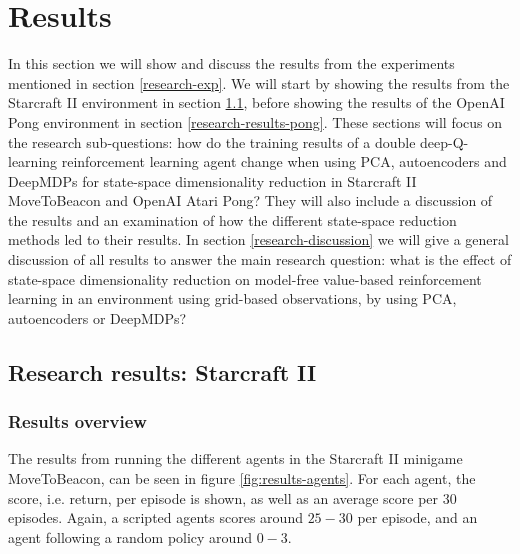 \section{Results}\label{research-results}
In this section we will show and discuss the results from the experiments mentioned in section \ref{research-exp}. We will start by showing the results from the Starcraft II environment in section \ref{research-results-pysc2}, before showing the results of the OpenAI Pong environment in section \ref{research-results-pong}. These sections will focus on the research sub-questions: how do the training results of a double deep-Q-learning reinforcement learning agent change when using PCA, autoencoders and DeepMDPs for state-space dimensionality reduction in Starcraft II MoveToBeacon and OpenAI Atari Pong? They will also include a discussion of the results and an examination of how the different state-space reduction methods led to their results. In section \ref{research-discussion} we will give a general discussion of all results to answer the main research question: what is the effect of state-space dimensionality reduction on model-free value-based reinforcement learning in an environment using grid-based observations, by using PCA, autoencoders or DeepMDPs?

\subsection{Research results: Starcraft II}\label{research-results-pysc2}
\subsubsection{Results overview}
The results from running the different agents in the Starcraft II minigame MoveToBeacon, can be seen in figure \ref{fig:results-agents}. For each agent, the score, i.e. return, per episode is shown, as well as an average score per $30$ episodes. Again, a scripted agents scores around $25-30$ per episode, and an agent following a random policy around $0-3$.


